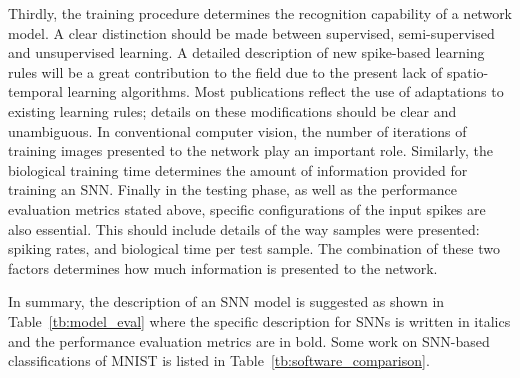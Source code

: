 \documentclass{frontiersENG} %
\begin{document}
Thirdly, the training procedure determines the recognition capability of a network model.
A clear distinction should be made between supervised, semi-supervised and unsupervised learning.
A detailed description of new spike-based learning rules will be a great contribution to the field due to the present lack of spatio-temporal learning algorithms.
Most publications reflect the use of adaptations to existing learning rules; details on these modifications should be clear and unambiguous.
In conventional computer vision, the number of iterations of training images presented to the network play an important role.
Similarly, the biological training time determines the amount of information provided for training an SNN.
Finally in the testing phase, as well as the performance evaluation metrics stated above, specific configurations of the input spikes are also essential.
This should include details of the way samples were presented: spiking rates, and biological time per test sample.
The combination of these two factors determines how much information is presented to the network.

In summary, the description of an SNN model is suggested as shown in Table~\ref{tb:model_eval} where the specific description for SNNs is written in italics and the performance evaluation metrics are in bold.
Some work on SNN-based classifications of MNIST is listed in Table~\ref{tb:software_comparison}.
\end{document}

